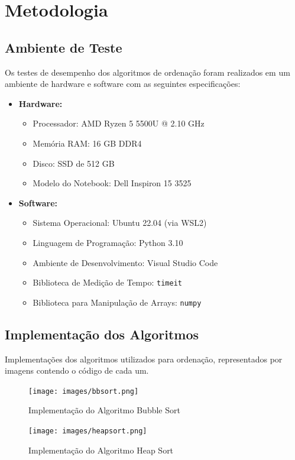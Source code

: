 \documentclass[12pt,a4paper]{article}
\begin{document}
\section{Metodologia}
\subsection{Ambiente de Teste}
Os testes de desempenho dos algoritmos de ordenação foram realizados em um ambiente de hardware e software com as seguintes especificações:

\begin{itemize}
    \item \textbf{Hardware:}
    \begin{itemize}
        \item Processador: AMD Ryzen 5 5500U @ 2.10 GHz
        \item Memória RAM: 16 GB DDR4
        \item Disco: SSD de 512 GB
        \item Modelo do Notebook: Dell Inspiron 15 3525
    \end{itemize}
    \item \textbf{Software:}
    \begin{itemize}
        \item Sistema Operacional: Ubuntu 22.04 (via WSL2)
        \item Linguagem de Programação: Python 3.10
        \item Ambiente de Desenvolvimento: Visual Studio Code
        \item Biblioteca de Medição de Tempo: \texttt{timeit}
        \item Biblioteca para Manipulação de Arrays: \texttt{numpy}
    \end{itemize}
\end{itemize}

\subsection{Implementação dos Algoritmos}
Implementações dos algoritmos utilizados para ordenação, representados por imagens contendo o código de cada um.

\begin{figure}[H]
    \centering
    \texttt{[image: images/bbsort.png]}
    \caption{Implementação do Algoritmo Bubble Sort}
    \label{fig:bubblesort}
\end{figure}

\begin{figure}[H]
    \centering
    \texttt{[image: images/heapsort.png]}
    \caption{Implementação do Algoritmo Heap Sort}
    \label{fig:heapsort}
\end{figure}
\end{document}
